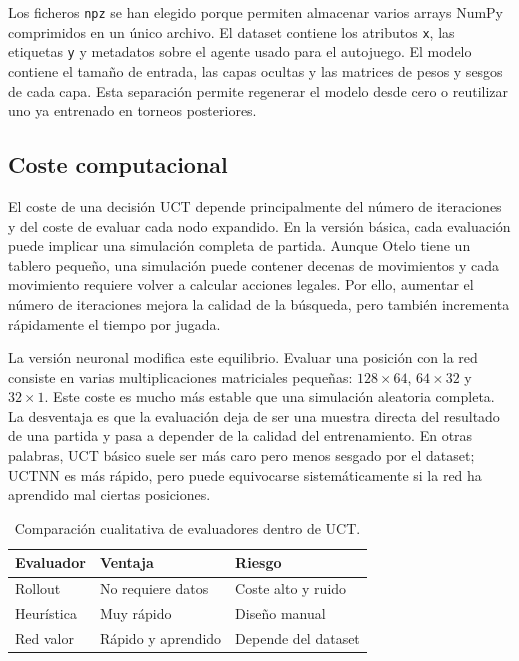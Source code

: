 \documentclass[conference,a4paper]{IEEEtran}
\begin{document}
Los ficheros \texttt{npz} se han elegido porque permiten almacenar varios
arrays NumPy comprimidos en un único archivo. El dataset contiene los atributos
\texttt{x}, las etiquetas \texttt{y} y metadatos sobre el agente usado para el
autojuego. El modelo contiene el tamaño de entrada, las capas ocultas y las
matrices de pesos y sesgos de cada capa. Esta separación permite regenerar el
modelo desde cero o reutilizar uno ya entrenado en torneos posteriores.

\subsection{Coste computacional}

El coste de una decisión UCT depende principalmente del número de iteraciones y
del coste de evaluar cada nodo expandido. En la versión básica, cada evaluación
puede implicar una simulación completa de partida. Aunque Otelo tiene un tablero
pequeño, una simulación puede contener decenas de movimientos y cada movimiento
requiere volver a calcular acciones legales. Por ello, aumentar el número de
iteraciones mejora la calidad de la búsqueda, pero también incrementa
rápidamente el tiempo por jugada.

La versión neuronal modifica este equilibrio. Evaluar una posición con la red
consiste en varias multiplicaciones matriciales pequeñas: \(128 \times 64\),
\(64 \times 32\) y \(32 \times 1\). Este coste es mucho más estable que una
simulación aleatoria completa. La desventaja es que la evaluación deja de ser
una muestra directa del resultado de una partida y pasa a depender de la calidad
del entrenamiento. En otras palabras, UCT básico suele ser más caro pero menos
sesgado por el dataset; UCTNN es más rápido, pero puede equivocarse
sistemáticamente si la red ha aprendido mal ciertas posiciones.

\begin{table}[h]
\centering
\caption{Comparación cualitativa de evaluadores dentro de UCT.}
\label{tab:evaluadores}
\begin{tabular}{lll}
\toprule
Evaluador & Ventaja & Riesgo \\
\midrule
Rollout & No requiere datos & Coste alto y ruido \\
Heurística & Muy rápido & Diseño manual \\
Red valor & Rápido y aprendido & Depende del dataset \\
\bottomrule
\end{tabular}
\end{table}
\end{document}
